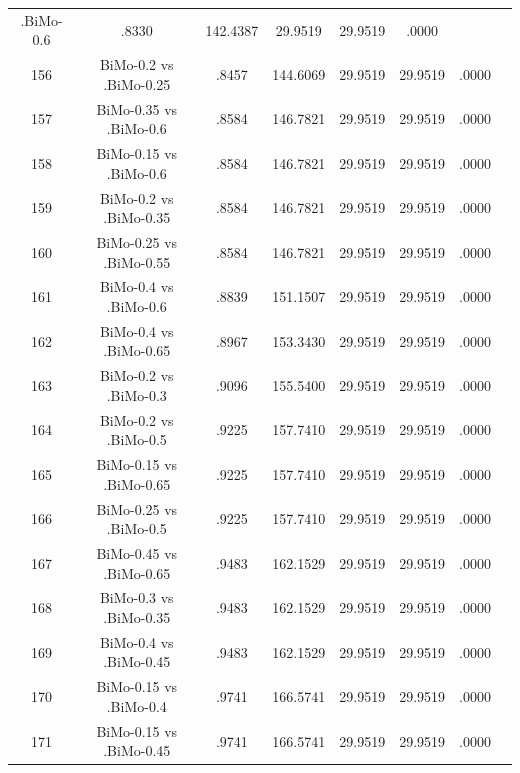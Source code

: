 \documentclass[a4paper,10pt]{article}
\begin{document}
\begin{landscape}
\begin{table}[!htp]
\begin{tabular}{cccccccc}
.BiMo-0.6&.8330&142.4387&29.9519&29.9519&.0000\\156&BiMo-0.2 vs .BiMo-0.25&.8457&144.6069&29.9519&29.9519&.0000\\157&BiMo-0.35 vs .BiMo-0.6&.8584&146.7821&29.9519&29.9519&.0000\\158&BiMo-0.15 vs .BiMo-0.6&.8584&146.7821&29.9519&29.9519&.0000\\159&BiMo-0.2 vs .BiMo-0.35&.8584&146.7821&29.9519&29.9519&.0000\\160&BiMo-0.25 vs .BiMo-0.55&.8584&146.7821&29.9519&29.9519&.0000\\161&BiMo-0.4 vs .BiMo-0.6&.8839&151.1507&29.9519&29.9519&.0000\\162&BiMo-0.4 vs .BiMo-0.65&.8967&153.3430&29.9519&29.9519&.0000\\163&BiMo-0.2 vs .BiMo-0.3&.9096&155.5400&29.9519&29.9519&.0000\\164&BiMo-0.2 vs .BiMo-0.5&.9225&157.7410&29.9519&29.9519&.0000\\165&BiMo-0.15 vs .BiMo-0.65&.9225&157.7410&29.9519&29.9519&.0000\\166&BiMo-0.25 vs .BiMo-0.5&.9225&157.7410&29.9519&29.9519&.0000\\167&BiMo-0.45 vs .BiMo-0.65&.9483&162.1529&29.9519&29.9519&.0000\\168&BiMo-0.3 vs .BiMo-0.35&.9483&162.1529&29.9519&29.9519&.0000\\169&BiMo-0.4 vs .BiMo-0.45&.9483&162.1529&29.9519&29.9519&.0000\\170&BiMo-0.15 vs .BiMo-0.4&.9741&166.5741&29.9519&29.9519&.0000\\171&BiMo-0.15 vs .BiMo-0.45&.9741&166.5741&29.9519&29.9519&.0000\\\hline
\end{tabular}
\end{table}

\end{landscape}
\end{document}
